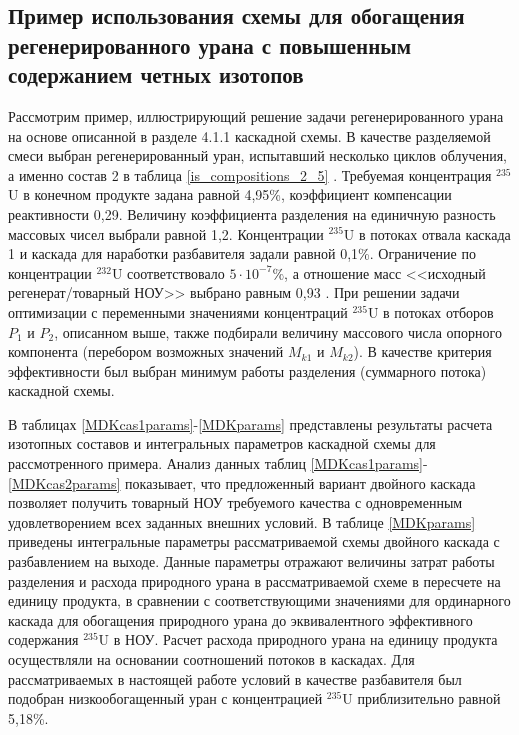 \subsection{Пример использования схемы для обогащения регенерированного урана с повышенным содержанием четных изотопов}

Рассмотрим пример, иллюстрирующий решение задачи регенерированного урана на основе описанной в разделе 4.1.1 каскадной схемы. В качестве разделяемой смеси выбран регенерированный уран, испытавший несколько циклов облучения, а именно состав 2 в таблица \ref{is_compositions_2_5} \cite{smirnovObogashchenieRegenerirovannogoUrana2018}. Требуемая концентрация $^{235}$U в конечном продукте задана равной 4,95\%, коэффициент компенсации реактивности 0,29. Величину коэффициента разделения на единичную разность массовых чисел выбрали равной 1,2. Концентрации $^{235}$U в потоках отвала каскада 1 и каскада для наработки разбавителя задали равной 0,1\%. Ограничение по концентрации $^{232}$U соответствовало $5\cdot10^{-7} \%$, а отношение масс <<исходный регенерат/товарный НОУ>> выбрано равным 0,93 \cite{smirnovObogashchenieRegenerirovannogoUrana2018}.  При решении задачи оптимизации с переменными значениями концентраций $^{235}$U в потоках отборов $P_1$ и $P_2$, описанном выше, также подбирали величину массового числа опорного компонента (перебором возможных значений $M_{k1}$ и $M_{k2}$). В качестве критерия эффективности был выбран минимум работы разделения (суммарного потока) каскадной схемы.

В таблицах \ref{MDKcas1params}-\ref{MDKparams} представлены результаты расчета изотопных составов и интегральных параметров каскадной схемы для рассмотренного примера. Анализ данных таблиц \ref{MDKcas1params}-\ref{MDKcas2params} показывает, что предложенный вариант двойного каскада позволяет получить товарный НОУ требуемого качества с одновременным удовлетворением всех заданных внешних условий. В таблице \ref{MDKparams} приведены интегральные параметры рассматриваемой схемы двойного каскада с разбавлением на выходе. Данные параметры отражают величины затрат работы разделения и расхода природного урана в рассматриваемой схеме в пересчете на единицу продукта, в сравнении с соответствующими значениями для ординарного каскада для обогащения природного урана до эквивалентного эффективного содержания $^{235}$U в НОУ. Расчет расхода природного урана на единицу продукта осуществляли на основании соотношений потоков в каскадах. Для рассматриваемых в настоящей работе условий в качестве разбавителя был подобран низкообогащенный уран с концентрацией $^{235}$U приблизительно равной 5,18\%.    



